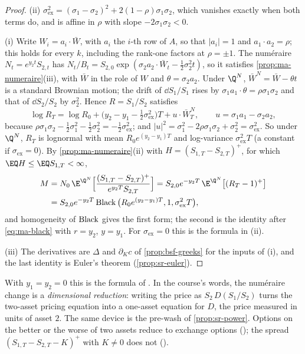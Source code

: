 \begin{proof}
(ii) $\sigma_{\mathrm{ex}}^2=(\sigma_1-\sigma_2)^2+2(1-\rho)\sigma_1\sigma_2$, which vanishes exactly
when both terms do, and is affine in $\rho$ with slope $-2\sigma_1\sigma_2<0$.

(i) Write $W_i=a_i\cdot\bar W$, with $a_i$ the $i$-th row of $A$, so that $|a_i|=1$ and
$a_1\cdot a_2=\rho$; this holds for every $k$, including the rank-one factors at $\rho=\pm1$. The
num\'eraire $N_t=e^{y_2t}S_{2,t}$ has $N_t/B_t=S_{2,0}\exp(\sigma_2a_2\cdot\bar W_t-\frac12\sigma_2^2t)$, so it
satisfies \cref{prop:ma-numeraire}(iii), with $\bar W$ in the role of $W$ and $\theta=\sigma_2a_2$. Under
$\Q^N$, $\bar W^N=\bar W-\theta t$ is a standard Brownian motion; the drift of $\dd S_1/S_1$ rises by
$\sigma_1a_1\cdot\theta=\rho\sigma_1\sigma_2$ and that of $\dd S_2/S_2$ by $\sigma_2^2$. Hence
$R=S_1/S_2$ satisfies
\[
  \log R_T=\log R_0+\big(y_2-y_1-\tfrac12\sigma_{\mathrm{ex}}^2\big)T+u\cdot\bar W^N_T,\qquad
  u=\sigma_1a_1-\sigma_2a_2,
\]
because $\rho\sigma_1\sigma_2-\frac12\sigma_1^2-\frac12\sigma_2^2=-\frac12\sigma_{\mathrm{ex}}^2$; and
$|u|^2=\sigma_1^2-2\rho\sigma_1\sigma_2+\sigma_2^2=\sigma_{\mathrm{ex}}^2$. So under $\Q^N$, $R_T$ is lognormal with mean $R_0e^{(y_2-y_1)T}$ and
log-variance $\sigma_{\mathrm{ex}}^2T$ (a constant if $\sigma_{\mathrm{ex}}=0$). By
\cref{prop:ma-numeraire}(ii) with $H=(S_{1,T}-S_{2,T})^+$, for which $\EQ H\le\EQ S_{1,T}<\infty$,
\begin{align*}
  M&=N_0\,\E^{\Q^N}\Big[\frac{(S_{1,T}-S_{2,T})^+}{e^{y_2T}S_{2,T}}\Big]
  =S_{2,0}e^{-y_2T}\,\E^{\Q^N}\big[(R_T-1)^+\big]\\
  &=S_{2,0}e^{-y_2T}\Black\big(R_0e^{(y_2-y_1)T},1,\sigma_{\mathrm{ex}}^2T\big),
\end{align*}
and homogeneity of $\operatorname{Black}$ gives the first form; the second is the identity after
\eqref{eq:ma-black} with $r=y_2$, $y=y_1$. For $\sigma_{\mathrm{ex}}=0$ this is the formula in (ii).

(iii) The derivatives are $\Delta$ and $\partial_Kc$ of \cref{prop:bsf-greeks} for the inputs of (i), and
the last identity is Euler's theorem (\cref{prop:sr-euler}).
\end{proof}

With $y_1=y_2=0$ this is the formula of \textcite{margrabe}. In the course's words, the
num\'eraire change is a \emph{dimensional reduction}: writing the price as $S_2\,D(S_1/S_2)$ turns
the two-asset pricing equation into a one-asset equation for $D$, the price measured in units of
asset $2$. The same device is the pre-wash of \cref{prop:sr-power}. Options on the better or the
worse of two assets reduce to exchange options (); the spread
$(S_{1,T}-S_{2,T}-K)^+$ with $K\ne0$ does not ().

